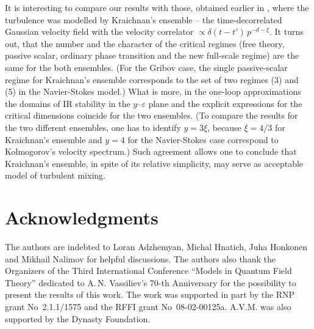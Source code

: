 \documentclass[12pt]{iopart}
\begin{document}
It is interesting to compare our results with those, obtained earlier in
\cite{AIK}, where the turbulence was modelled by Kraichnan's ensemble --
the time-decorrelated Gaussian velocity field with the velocity correlator
$\propto \delta(t-t') \, p^{-d-\xi}$. It turns out, that the number and
the character of the critical regimes (free theory, passive scalar,
ordinary phase transition and the new full-scale regime) are the same for
the both ensembles. (For the Gribov case, the single passive-scalar regime
for Kraichnan's ensemble corresponds to the set of two regimes (3) and (5)
in the Navier-Stokes model.) What is more, in the one-loop approximations
the domains of IR stability in the $y$--$\varepsilon$ plane and the explicit
expressions for the critical dimensions coincide for the two ensembles.
(To compare the results for the two different ensembles, one has to identify
$y=3\xi$, because $\xi=4/3$ for Kraichnan's ensemble and $y=4$ for the
Navier-Stokes case correspond to Kolmogorov's velocity spectrum.)  Such
agreement allows one to conclude that Kraichnan's  ensemble, in spite of
its relative simplicity, may serve as acceptable model of turbulent mixing.


\section*{Acknowledgments}

The authors are indebted to Loran Adzhemyan, Michal Hnatich, Juha Honkonen
and Mikhail Nalimov for helpful discussions.
The authors also thank the Organizers of the Third International Conference
``Models in Quantum Field Theory'' dedicated to A.\,N. Vassiliev's
70-th Anniversary for the possibility to present the results of this work.
The work was supported in part by the RNP grant No~2.1.1/1575 and the RFFI
grant No~08-02-00125a. A.V.M. was also supported by the Dynasty Foundation.
\end{document}
